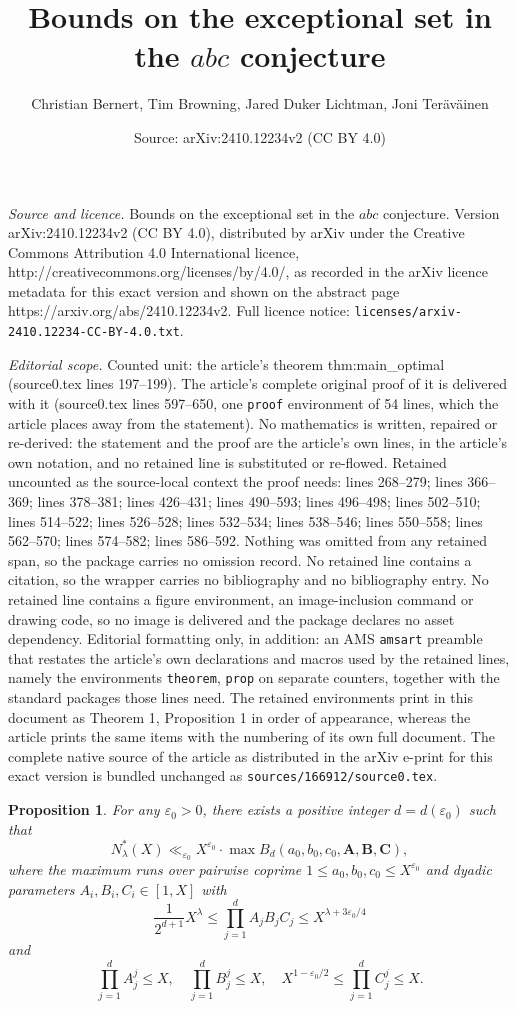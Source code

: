 \documentclass[10pt,a4paper]{amsart}
\title{Bounds on the exceptional set in the $abc$ conjecture}
\author{Christian Bernert, Tim Browning, Jared Duker Lichtman, Joni Ter\"av\"ainen}
\date{Source: arXiv:2410.12234v2 (CC BY 4.0)}
\newtheorem{prop}{Proposition}
\def\Ab{\mathbf{A}}
\def\Bb{\mathbf{B}}
\def\Cb{\mathbf{C}}
\renewcommand{\le}{\leqslant}
\renewcommand{\leq}{\leqslant}
\begin{document}
\maketitle

\noindent\emph{Source and licence.} Bounds on the exceptional set in the $abc$ conjecture. Version arXiv:2410.12234v2 (CC BY 4.0), distributed by arXiv under the Creative Commons Attribution 4.0 International licence, http://creativecommons.org/licenses/by/4.0/, as recorded in the arXiv licence metadata for this exact version and shown on the abstract page https://arxiv.org/abs/2410.12234v2. Full licence notice: \texttt{licenses/arxiv-2410.12234-CC-BY-4.0.txt}.\par\smallskip

\noindent\textit{Editorial scope.} Counted unit: the article's theorem thm:main\_optimal (source0.tex lines 197--199). The article's complete original proof of it is delivered with it (source0.tex lines 597--650, one \texttt{proof} environment of 54 lines, which the article places away from the statement). No mathematics is written, repaired or re-derived: the statement and the proof are the article's own lines, in the article's own notation, and no retained line is substituted or re-flowed.  Retained uncounted as the source-local context the proof needs: lines 268--279; lines 366--369; lines 378--381; lines 426--431; lines 490--593; lines 496--498; lines 502--510; lines 514--522; lines 526--528; lines 532--534; lines 538--546; lines 550--558; lines 562--570; lines 574--582; lines 586--592.  Nothing was omitted from any retained span, so the package carries no omission record.  No retained line contains a citation, so the wrapper carries no bibliography and no bibliography entry.  No retained line contains a figure environment, an image-inclusion command or drawing code, so no image is delivered and the package declares no asset dependency.  Editorial formatting only, in addition: an AMS \texttt{amsart} preamble that restates the article's own declarations and macros used by the retained lines, namely the environments \texttt{theorem}, \texttt{prop} on separate counters, together with the standard packages those lines need.  The retained environments print in this document as Theorem 1, Proposition 1 in order of appearance, whereas the article prints the same items with the numbering of its own full document.  The complete native source of the article as distributed in the arXiv e-print for this exact version is bundled unchanged as \texttt{sources/166912/source0.tex}.
\begin{prop}\label{prop:reduction}
    For any $\varepsilon_0>0$, there exists a positive integer $d=d(\varepsilon_0)$ such that
    \[
    N_{\lambda}^*(X) \ll_{\varepsilon_0} X^{\varepsilon_0} \cdot \max B_d(a_0,b_0,c_0,\Ab,\Bb,\Cb),
    \]
    where the maximum runs over pairwise coprime $1\le a_0,b_0,c_0 \le X^{\varepsilon_0}$ and dyadic parameters $A_i,B_i,C_i \in [1,X]$ with
    \[
    \frac{1}{2^{d+1}}X^{\lambda}\leq 
    \prod_{j=1}^d A_jB_jC_j \le X^{\lambda+3\varepsilon_0/4}\]
    and
    \[\prod_{j=1}^d A_j^j \le X, \quad \prod_{j=1}^d B_j^j \le X, \quad X^{1-\varepsilon_0/2} \le \prod_{j=1}^d C_j^j \le X.\]
\end{prop}
\end{document}
